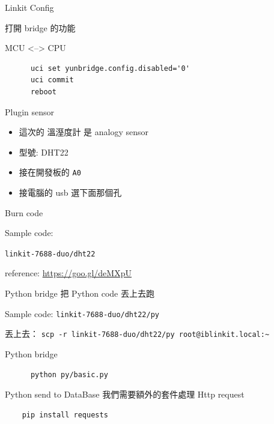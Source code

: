\documentclass{beamer}
\begin{document}
\begin{frame}[fragile]{Linkit Config}
  \begin{center}
    \large
    打開 bridge 的功能

    MCU <--> CPU

    \begin{verbatim}
      uci set yunbridge.config.disabled='0'
      uci commit
      reboot
    \end{verbatim}
  \end{center}
\end{frame}

\begin{frame}[fragile]{Plugin sensor}
  \Large
  \begin{itemize}
    \item 這次的 溫溼度計 是 analogy sensor
    \item 型號: DHT22
    \item 接在開發板的 \verb`A0`
    \item 接電腦的 usb 選下面那個孔
  \end{itemize}
\end{frame}

\begin{frame}[fragile]{Burn code}
  \huge
  \begin{center}
    Sample code:

    \verb`linkit-7688-duo/dht22`

    reference: \url{https://goo.gl/deMXpU}
  \end{center}

\end{frame}

\begin{frame}[fragile]{Python bridge}
  \Large
  把 Python code 丟上去跑

  Sample code: \verb`linkit-7688-duo/dht22/py`

  丟上去： \verb`scp -r linkit-7688-duo/dht22/py root@iblinkit.local:~`
\end{frame}

\begin{frame}[fragile]{Python bridge}
  \begin{center}
    \Large
    \begin{verbatim}
      python py/basic.py
    \end{verbatim}
  \end{center}
\end{frame}

\begin{frame}[fragile]{Python send to DataBase}
  \Large
  我們需要額外的套件處理 Http request

  \begin{verbatim}
    pip install requests
  \end{verbatim}
\end{frame}
\end{document}
